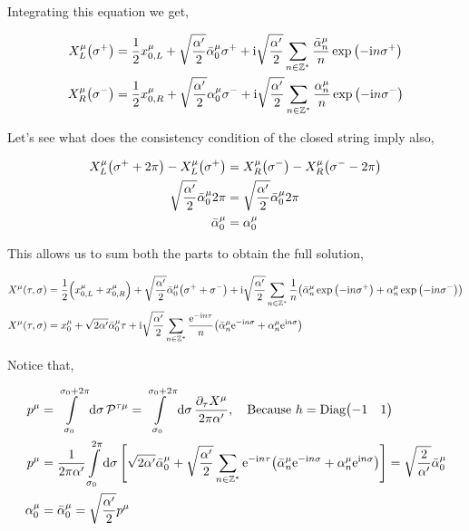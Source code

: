 Integrating this equation we get,

\begin{align*}
    X_L^\mu\qty(\sigma^+)&=\frac12 x_{0,L}^\mu+\sqrt{\frac{\alpha'}{2}}{\bar\alpha}_0^\mu\sigma^++\textnormal{i}\sqrt{\frac{\alpha'}{2}}\sum\limits_{n\in\mathbb Z^\ast}\frac{{\bar\alpha}^\mu_n}{n}\exp\qty(-\textnormal{i} n \sigma^+)\\
    X_R^\mu\qty(\sigma^-)&=\frac12 x_{0,R}^\mu+\sqrt{\frac{\alpha'}{2}}\alpha_0^\mu\sigma^-+\textnormal{i}\sqrt{\frac{\alpha'}{2}}\sum\limits_{n\in\mathbb Z^\ast}\frac{{\alpha}^\mu_n}{n}\exp\qty(-\textnormal{i} n \sigma^-)
\end{align*}

Let's see what does the consistency condition of the closed string imply also,

\begin{align*}
    X_L^\mu\qty(\sigma^++2\pi)-X_L^\mu\qty(\sigma^+)&=X_R^\mu\qty(\sigma^-)-X_R^\mu\qty(\sigma^--2\pi)\\
    \sqrt{\frac{\alpha'}{2}}{\bar\alpha}_0^\mu2\pi&=\sqrt{\frac{\alpha'}{2}}{\bar\alpha}_0^\mu2\pi\\
    {\bar\alpha}_0^\mu&=\alpha_0^\mu
\end{align*}

This allows us to sum both the parts to obtain the full solution,

\begin{align*}
    X^\mu\qty(\tau,\sigma)&=\frac12\qty(x_{0,L}^\mu+x_{0,R}^\mu)+\sqrt{\frac{\alpha'}{2}}{\bar\alpha}_0^\mu\qty(\sigma^++\sigma^-)+\textnormal{i}\sqrt{\frac{\alpha'}{2}}\sum\limits_{n\in\mathbb Z^\ast}\frac{1}{n}\qty({\bar\alpha}^\mu_n\exp\qty(-\textnormal{i} n \sigma^+)+{\alpha}^\mu_n\exp\qty(-\textnormal{i} n \sigma^-))\\
    X^\mu\qty(\tau,\sigma)&=x_{0}^\mu+\sqrt{2\alpha'}{\bar\alpha}_0^\mu\tau+\textnormal{i}\sqrt{\frac{\alpha'}{2}}\sum\limits_{n\in\mathbb Z^\ast}\frac{\textnormal{e}^{-\textnormal{i} n\tau}}{n}\qty({\bar\alpha}^\mu_n\textnormal{e}^{-\textnormal{i} n\sigma}+{\alpha}^\mu_n\textnormal{e}^{\textnormal{i} n\sigma})
\end{align*}

Notice that,

\begin{align*}
    p^\mu&=\int\limits_{\sigma_0}^{\sigma_0+2\pi}\dd{\sigma}\mathcal P^{\tau\mu}=\int\limits_{\sigma_0}^{\sigma_0+2\pi}\dd{\sigma}\frac{\partial_\tau X^\mu}{2\pi\alpha'},\ \ \ \textnormal{Because }h=\textnormal{Diag}\mqty(-1&1)\\
    p^\mu&=\frac{1}{2\pi\alpha'}\int\limits_{\sigma_0}^{2\pi}\dd{\sigma}\qty[\sqrt{2\alpha'}{\bar\alpha_0}^\mu+\sqrt{\frac{\alpha'}{2}}\sum\limits_{n\in\mathbb Z^\ast}\e^{-\im n\tau}\qty({\bar\alpha}_n^\mu\e^{-\im n\sigma}+{\alpha}_n^\mu\e^{\im n\sigma})]=\sqrt{\frac{2}{\alpha'}}{\bar\alpha}_0^\mu\\
    \alpha_0^\mu&={\bar\alpha}_0^\mu=\sqrt{\frac{\alpha'}{2}}p^\mu
\end{align*}

